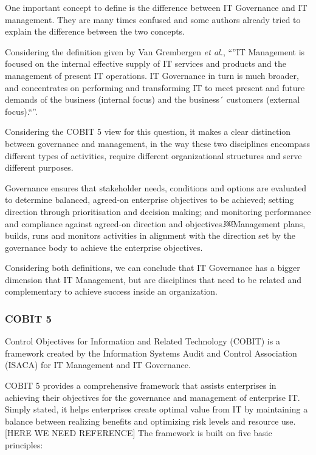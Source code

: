 One important concept to define is the difference between IT Governance and IT management. They are many times confused and some authors already tried to explain the difference between the two concepts.\par
Considering the definition given by Van Grembergen \textit{et al.}, ``''IT Management is focused on the internal effective supply of IT services and products and the management of present IT operations. IT Governance in turn is much broader, and concentrates on performing and transforming IT to meet present and future demands of the business (internal focus) and the business´ customers (external focus).``''.\par
 Considering the COBIT 5 view for this question, it makes a clear distinction between governance and management, in the way these two disciplines encompass different types of activities, require different organizational structures and serve different purposes.\par
 Governance ensures that stakeholder needs, conditions and options are evaluated to determine balanced, agreed-on enterprise objectives to be achieved; setting direction through prioritisation and decision making; and monitoring performance and compliance against agreed-on direction and objectives.￼Management plans, builds, runs and monitors activities in alignment with the direction set by the governance body to achieve the enterprise objectives.\par
 Considering both definitions, we can conclude that IT Governance has a bigger dimension that IT Management, but are disciplines that need to be related and complementary to achieve success inside an organization.

\subsubsection{COBIT 5}

Control Objectives for Information and Related Technology (COBIT) is a framework created by the Information Systems Audit and Control Association (ISACA) for IT Management and IT Governance.\par
COBIT 5 provides a comprehensive framework that assists enterprises in achieving their objectives for the governance and management of enterprise IT. Simply stated, it helps enterprises create optimal value from IT by maintaining a balance between realizing benefits and optimizing risk levels and resource use. [HERE WE NEED REFERENCE]
The framework is built on five basic principles:

